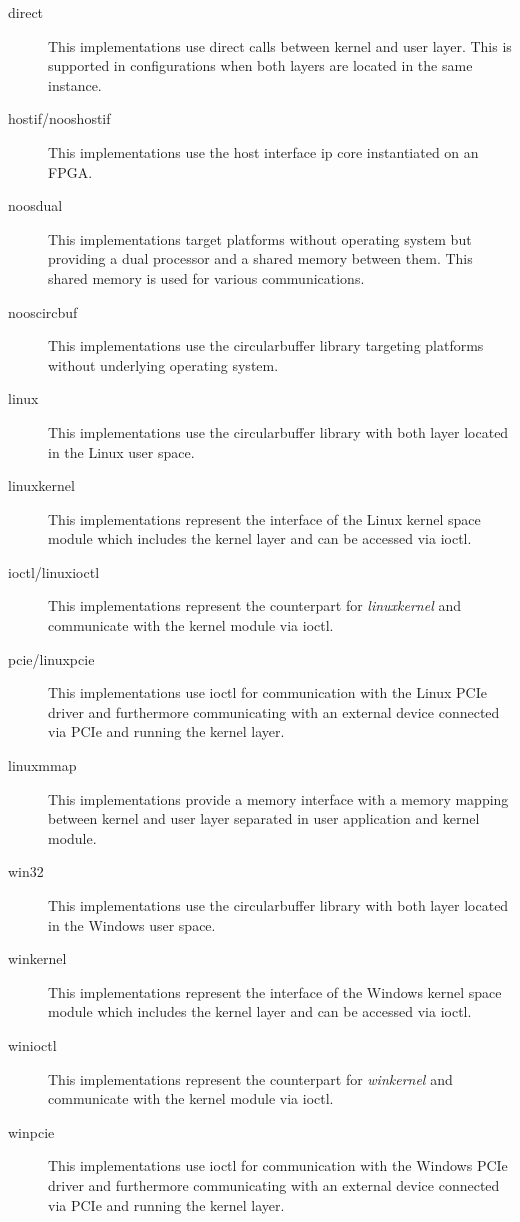 \begin{description}
    \item[direct] This implementations use direct calls between kernel and user layer.
    This is supported in configurations when both layers are located in the same instance.
    \item[hostif/nooshostif] This implementations use the host interface ip core instantiated on an FPGA.
    \item[noosdual] This implementations target platforms without operating system but providing a dual processor and a shared memory between them.
    This shared memory is used for various communications.
    \item[nooscircbuf] This implementations use the circularbuffer library targeting platforms without underlying operating system.
    \item[linux] This implementations use the circularbuffer library with both layer located in the Linux user space.
    \item[linuxkernel] This implementations represent the interface of the Linux kernel space module which includes the kernel layer and can be accessed via ioctl.
    \item[ioctl/linuxioctl] This implementations represent the counterpart for \emph{linuxkernel} and communicate with the kernel module via ioctl.
    \item[pcie/linuxpcie] This implementations use ioctl for communication with the Linux PCIe driver and furthermore communicating with an external device connected via PCIe and running the kernel layer.
    \item[linuxmmap] This implementations provide a memory interface with a memory mapping between kernel and user layer separated in user application and kernel module.
    \item[win32] This implementations use the circularbuffer library with both layer located in the Windows user space.
    \item[winkernel] This implementations represent the interface of the Windows kernel space module which includes the kernel layer and can be accessed via ioctl.
    \item[winioctl] This implementations represent the counterpart for \emph{winkernel} and communicate with the kernel module via ioctl.
    \item[winpcie] This implementations use ioctl for communication with the Windows PCIe driver and furthermore communicating with an external device connected via PCIe and running the kernel layer.

\end{description}
